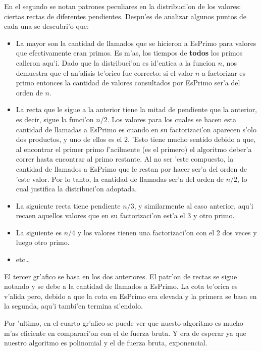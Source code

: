 En el segundo se notan patrones peculiares en la distribuci'on de los valores: ciertas rectas de diferentes pendientes. Despu'es de analizar algunos puntos de cada una se descubri'o que:
\begin{itemize}
\item La mayor son la cantidad de llamados que se hicieron a EsPrimo para valores que efectivamente eran primos. Es m'as, los tiempos de {\bf todos} los primos calleron aqu'i. Dado que la distribuci'on es id'entica a la funcion $n$, nos demuestra que el an'alisis te'orico fue correcto: si el valor $n$ a factorizar es primo entonces la cantidad de valores consultados por EsPrimo ser'a del orden de $n$.
\item La recta que le sigue a la anterior tiene la mitad de pendiente que la anterior, es decir, sigue la funci'on $n/2$. Los valores para los cuales se hacen esta cantidad de llamadas a EsPrimo es cuando en su factorizaci'on aparecen s'olo dos productos, y uno de ellos es el 2. 'Esto tiene mucho sentido debido a que, al encontrar el primer primo f'acilmente (es el primero) el algoritmo deber'a correr hasta encontrar al primo restante. Al no ser 'este compuesto, la cantidad de llamados a EsPrimo que le restan por hacer ser'a del orden de 'este valor. Por lo tanto, la cantidad de llamadas ser'a del orden de $n/2$, lo cual justifica la distribuci'on adoptada.
\item La siguiente recta tiene pendiente $n/3$, y similarmente al caso anterior, aqu'i recaen aquellos valores que en su factorizaci'on est'a el 3 y otro primo.
\item La siguiente es $n/4$ y los valores tienen una factorizaci'on con el 2 dos veces y luego otro primo.
\item etc\dots
\end{itemize}

El tercer gr'afico se basa en los dos anteriores. El patr'on de rectas se sigue notando y se debe a la cantidad de llamados a EsPrimo. La cota te'orica es v'alida pero, debido a que la cota en EsPrimo era elevada y la primera se basa en la segunda, aqu'i tambi'en termina si'endolo.

Por 'ultimo, en el cuarto gr'afico se puede ver que nuesto algoritmo es mucho m'as eficiente en comparaci'on con el de fuerza bruta. Y era de esperar ya que nuestro algoritmo es polinomial y el de fuerza bruta, exponencial.

\clearpage


